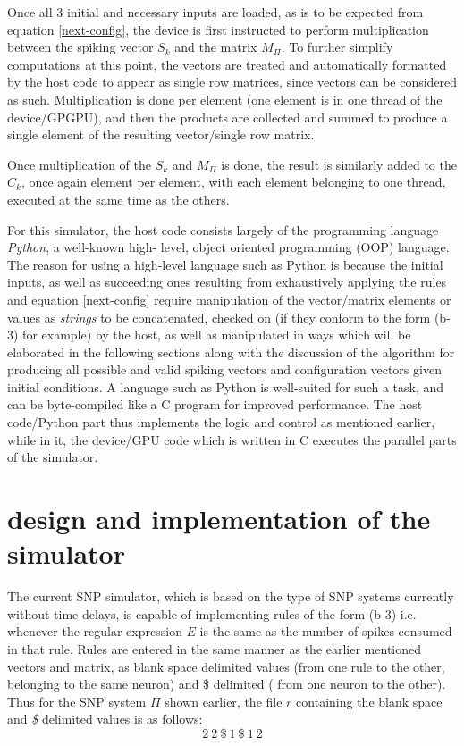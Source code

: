 \documentclass{acm_proc_article-sp}
\begin{document}
Once all 3 initial and necessary inputs are loaded, as is to be
expected from equation \ref{next-config}, the device is first instructed to
perform multiplication between the spiking vector $S_k$ and the
matrix $M_{\Pi}$. To further simplify computations at this point, the
vectors are treated and automatically formatted by the host
code to appear as single row matrices, since vectors can be
considered as such. Multiplication is done per element (one
element is in one thread of the device/GPGPU), and then the
products are collected and summed to produce a single
element of the resulting vector/single row matrix.

Once multiplication of the $S_k$ and $M_{\Pi}$ is done,
the result is similarly added to the $C_k$, once
again element per element, with each element belonging to
one thread, executed at the same time as the others.

For this simulator, the host code consists largely of
the programming language \emph{Python}, a well-known high-
level, object oriented programming (OOP) language. The
reason for using a high-level language such as Python is
because the initial inputs, as well as succeeding ones
resulting from exhaustively applying the rules and equation
\ref{next-config} require manipulation of the vector/matrix elements or
values as \emph{strings} to be concatenated, checked on (if they
conform to the form (b-3) for example) by the host, as well
as manipulated in ways which will be elaborated in the
following sections along with the discussion of the
algorithm for producing all possible and valid spiking
vectors and configuration vectors given initial conditions. A
language such as Python is well-suited for such a task, and
can be byte-compiled like a C program for improved
performance. The host code/Python part thus implements the
logic and control as mentioned earlier, while in it, the
device/GPU code which is written in C executes the parallel
parts of the simulator.

\section{design and implementation of
the simulator}\label{sect-snp-algo}

The current SNP simulator, which is based on the type of
SNP systems currently without time delays, is capable of
implementing rules of the form (b-3) i.e. whenever the
regular expression $E$ is the same as the number of spikes
consumed in that rule. Rules are entered in the same manner
as the earlier mentioned vectors and matrix, as blank space
delimited values (from one rule to the other, belonging to the same neuron) and \$ delimited ( from one neuron to the
other). Thus for the SNP system ${\Pi}$ shown earlier, the file $r$
containing the blank space and \textit{\$} delimited values is as
follows:
\begin{equation}\label{rules}
2~2~\$~1~\$~1~2
\end{equation}
\end{document}
